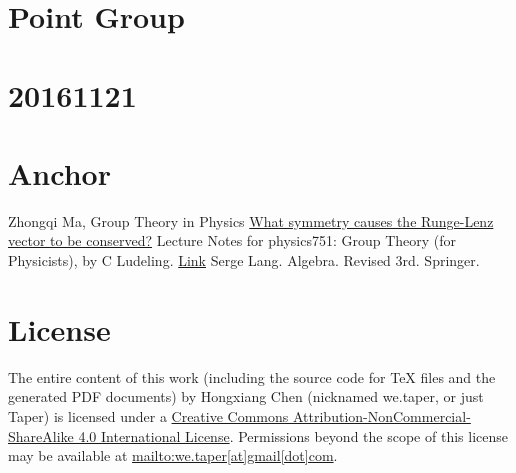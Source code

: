 \documentclass{article}
\begin{document}
\section{Point Group}
\label{sec:Point-Group}


\section{20161121}

\section{Anchor}
\label{sec:Anchor}
\begin{thebibliography}{1}
     Zhongqi Ma, Group Theory in Physics
     \href{physics.stackexchange.com/questions/18088/what-symmetry-causes-the-runge-lenz-vector-to-be-conserved}{What symmetry causes the Runge-Lenz vector to be conserved?}
     Lecture Notes for physics751: Group Theory (for
    Physicists), by C Ludeling.
    \href{http://www.th.physik.uni-bonn.de/nilles/people/luedeling/grouptheory/data/grouptheorynotes.pdf}{Link}
     Serge Lang. Algebra. Revised 3rd. Springer.
\end{thebibliography}
\printnomenclature
\section{License}
The entire content of this work (including the source code
for TeX files and the generated PDF documents) by 
Hongxiang Chen (nicknamed we.taper, or just Taper) is
licensed under a 
\href{http://creativecommons.org/licenses/by-nc-sa/4.0/}{Creative 
Commons Attribution-NonCommercial-ShareAlike 4.0 International 
License}. Permissions beyond the scope of this 
license may be available at \url{mailto:we.taper[at]gmail[dot]com}.
\end{document}
